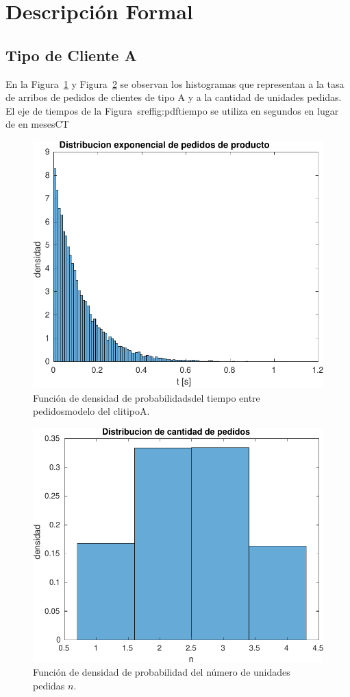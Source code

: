 \documentclass[10pt]{article}
\begin{document}
\section{Descripción Formal}
\subsection{Tipo de Cliente A}

En la Figura~\ref{fig:pdftiempo} y Figura~\ref{fig:pdfpedidos} se observan los histogramas que representan a la tasa de arribos de pedidos de clientes de tipo A y a la cantidad de unidades pedidas. El eje de tiempos de la Figura~sref{fig:pdftiempo} se utiliza en segundos en lugar de en mesesCT
\begin{figure}
\centering
\includegraphics[scale=1]{img/pdf_tiempo_pedidos}
\caption{Función de densidad de probabilidadsdel tiempo entre pedidosmodelo del clitipoA.}
\label{fig:pdftiempo}
\end{figure}

\begin{figure}
\centering
\includegraphics[scale=1]{img/pdf_cantidad_pedidos}
\caption{Función de densidad de probabilidad del número de unidades pedidas $n$.}
\label{fig:pdfpedidos}
\end{figure}
\end{document}
